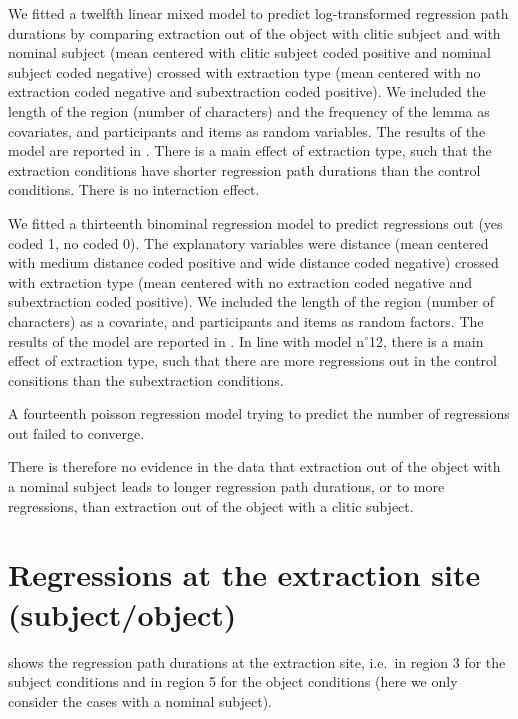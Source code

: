 We fitted a twelfth linear mixed model to predict log-transformed regression path durations by comparing extraction out of the object with clitic subject and with nominal subject (mean centered with clitic subject coded positive and nominal subject coded negative) crossed with extraction type (mean centered with no extraction coded negative and subextraction coded positive). We included the length of the region (number of characters) and the frequency of the lemma as covariates, and participants and items as random variables. 
The results of the model are reported in . There is a main effect of extraction type, such that the extraction conditions have shorter regression path durations than the control conditions. There is no interaction effect. 



We fitted a thirteenth binominal regression model to predict regressions out (yes coded 1, no coded 0). The explanatory variables were distance (mean centered with medium distance coded positive and wide distance coded negative) crossed with extraction type (mean centered with no extraction coded negative and subextraction coded positive). We included the length of the region (number of characters) as a covariate, and participants and items as random factors. 
The results of the model are reported in . In line with model n$^{\circ}$12, there is a main effect of extraction type, such that there are more regressions out in the control consitions than the subextraction conditions.



A fourteenth poisson regression model trying to predict the number of regressions out failed to converge.

There is therefore no evidence in the data that extraction out of the object with a nominal subject leads to longer regression path durations, or to more regressions, than extraction out of the object with a clitic subject.

\section{Regressions at the extraction site (subject/object)}

 shows the regression path durations at the extraction site, i.e.\ in region 3 for the subject conditions and in region 5 for the object conditions (here we only consider the cases with a nominal subject). 

